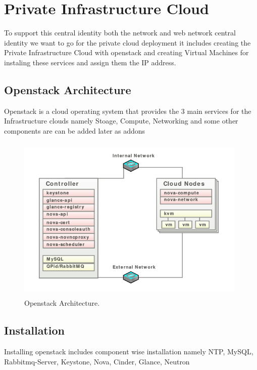 \documentclass[12pt]{report}
\begin{document}
\chapter{Private Infrastructure Cloud}
To support this central identity both the network and web network central identity we want to go for the private cloud deployment it includes creating the Private Infrastructure Cloud with openstack and creating Virtual Machines for instaling these services and assign them the IP address.

\section{Openstack Architecture}
Openstack is a cloud operating system that provides the 3 main services for the Infrastructure clouds namely Stoage, Compute, Networking and some other components are can be added later as addons
\underline{} \newline
\begin{figure}[H]
	\begin{center}
	\includegraphics[width=11cm,height=8cm]{./openstack_1.png}
	\caption{ Openstack Architecture.\label{fig:Openstack Architecture }}
	\end{center}
\end{figure}

\section{Installation}

Installing openstack includes component wise installation namely NTP, MySQL, Rabbitmq-Server, Keystone, Nova, Cinder, Glance, Neutron
\end{document}

